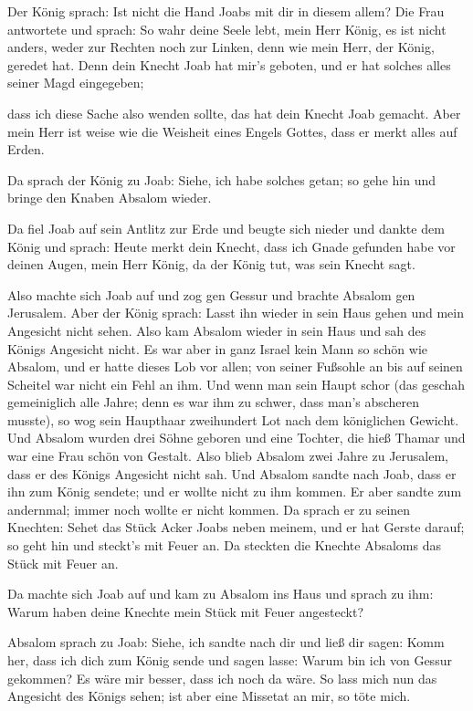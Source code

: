  Der König sprach: Ist nicht die Hand Joabs mit dir in
diesem allem? Die Frau antwortete und sprach: So wahr deine Seele lebt,
mein Herr König, es ist nicht anders, weder zur Rechten noch zur Linken,
denn wie mein Herr, der König, geredet hat. Denn dein Knecht Joab hat
mir's geboten, und er hat solches alles seiner Magd eingegeben;

 dass ich diese Sache also wenden sollte, das hat dein
Knecht Joab gemacht. Aber mein Herr ist weise wie die Weisheit eines
Engels Gottes, dass er merkt alles auf Erden.

 Da sprach der König zu Joab: Siehe, ich habe solches
getan; so gehe hin und bringe den Knaben Absalom wieder.

 Da fiel Joab auf sein Antlitz zur Erde und beugte sich
nieder und dankte dem König und sprach: Heute merkt dein Knecht, dass
ich Gnade gefunden habe vor deinen Augen, mein Herr König, da der König
tut, was sein Knecht sagt.

 Also machte sich Joab auf und zog gen Gessur und brachte
Absalom gen Jerusalem.  Aber der König sprach: Lasst ihn
wieder in sein Haus gehen und mein Angesicht nicht sehen. Also kam
Absalom wieder in sein Haus und sah des Königs Angesicht nicht.
 Es war aber in ganz Israel kein Mann so schön wie
Absalom, und er hatte dieses Lob vor allen; von seiner Fußsohle an bis
auf seinen Scheitel war nicht ein Fehl an ihm.  Und wenn
man sein Haupt schor (das geschah gemeiniglich alle Jahre; denn es war
ihm zu schwer, dass man's abscheren musste), so wog sein Haupthaar
zweihundert Lot nach dem königlichen Gewicht.  Und
Absalom wurden drei Söhne geboren und eine Tochter, die hieß Thamar und
war eine Frau schön von Gestalt.  Also blieb Absalom zwei
Jahre zu Jerusalem, dass er des Königs Angesicht nicht sah.
 Und Absalom sandte nach Joab, dass er ihn zum König
sendete; und er wollte nicht zu ihm kommen. Er aber sandte zum
andernmal; immer noch wollte er nicht kommen.  Da sprach
er zu seinen Knechten: Sehet das Stück Acker Joabs neben meinem, und er
hat Gerste darauf; so geht hin und steckt's mit Feuer an. Da steckten
die Knechte Absaloms das Stück mit Feuer an.

 Da machte sich Joab auf und kam zu Absalom ins Haus und
sprach zu ihm: Warum haben deine Knechte mein Stück mit Feuer
angesteckt?

 Absalom sprach zu Joab: Siehe, ich sandte nach dir und
ließ dir sagen: Komm her, dass ich dich zum König sende und sagen lasse:
Warum bin ich von Gessur gekommen? Es wäre mir besser, dass ich noch da
wäre. So lass mich nun das Angesicht des Königs sehen; ist aber eine
Missetat an mir, so töte mich.

